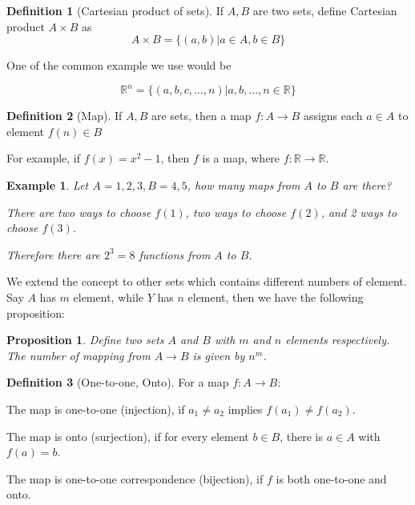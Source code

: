 \documentclass{article}
\theoremstyle{MyNonumberplain}
\theoremstyle{break}
\newcommand{\R}{\mathbb{R}}
\theoremstyle{break}
\newtheorem{proposition}{Proposition}[section]
\newtheorem{example}{Example}[section]
\theoremstyle{break}
\theoremstyle{definition}
\theoremstyle{break}
\newtheorem{definition}{Definition}[section]
\begin{document}
\begin{defbox}
    \begin{definition}[Cartesian product of sets]
        If $A, B$ are two sets, define Cartesian product $A \times B$ as
        \[ A \times B = \{ (a, b) |a \in A, b \in B \} \]    
    \end{definition}    
\end{defbox}

One of the common example we use would be 

    $$\R^n=\{(a,b,c,...,n)|a,b,...,n\in\R\}$$

\begin{defbox}
    \begin{definition}[Map]
        If $A,B$ are sets, then a map $f:A\to B$ assigns each $a\in A$ to element $f(n)\in B$
    \end{definition}
\end{defbox}

For example, if $f(x)=x^2-1$, then $f$ is a map, where $f:\R\to\R$.

\begin{expbox}
    \begin{example}
        Let $A={1,2,3},B={4,5}$, how many maps from $A$ to $B$ are there?\bigskip

        There are two ways to choose $f(1)$, two ways to choose $f(2)$, and 2 ways to choose $f(3)$. \bigskip

        Therefore there are $2^3=8$ functions from $A$ to $B$.
    \end{example}
\end{expbox}

We extend the concept to other sets which contains different numbers of element. Say $A$ has $m$ element, while $Y$ has $n$ element, then we have the following proposition:
\begin{thmbox}
    \begin{proposition}
        Define two sets $A$ and $B$ with $m$ and $n$ elements respectively. The number of mapping from $A\to B$ is given by $n^m$.
    \end{proposition}
\end{thmbox}

\begin{defbox}
    \begin{definition}[One-to-one, Onto]
       For a map $f:A\to B$:\bigskip

       The map is one-to-one (injection), if $a_1\neq a_2$ implies $f(a_1)\neq f(a_2)$.\bigskip

       The map is onto (surjection), if for every element $b\in B$, there is $a\in A$ with $f(a)=b$. \bigskip

       The map is one-to-one correspondence (bijection), if $f$ is both one-to-one and onto.
    \end{definition}
\end{defbox}
\end{document}
